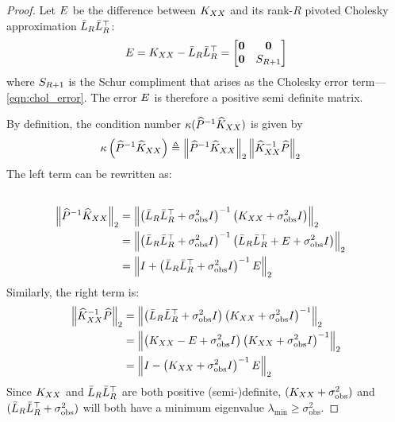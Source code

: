 \begin{proof}
  Let $E$ be the difference between $K_{XX}$ and its rank-$R$ pivoted Cholesky approximation $\bar{L}_R \bar{L}_R^\top$:
  \[
    E = K_{XX} - \bar{L}_R \bar{L}_R^\top = \begin{bmatrix} \mathbf{0} & \mathbf{0} \\ \mathbf{0} & S_{R+1} \end{bmatrix}
  \]
  where $S_{R+1}$ is the Schur compliment that arises as the Cholesky error term---\cref{eqn:chol_error}.
  The error $E$ is therefore a positive semi definite matrix.

  By definition, the condition number $\kappa ( \widehat{P}^{-1}\widehat{K}_{XX} )$ is given by
  \begin{align*}
    \kappa \left( \widehat{P}^{-1}\widehat{K}_{XX} \right)
    &\triangleq \left\Vert \widehat{P}^{-1}\widehat{K}_{XX} \right\Vert_{2} \left\Vert \widehat{K}_{XX}^{-1}\widehat{P} \right\Vert_{2}
  \end{align*}
  The left term can be rewritten as:
  \begin{align*}
    \\
    \left\Vert \widehat{P}^{-1}\widehat{K}_{XX} \right\Vert_{2}
    &= \left\Vert \left( \bar{L}_R \bar{L}_R^\top + \sigma^2_\text{obs} I \right)^{-1} \left(K_{XX} + \sigma^2_\text{obs} I \right) \right\Vert_{2}
    \\
    &= \left\Vert \left( \bar{L}_R \bar{L}_R^\top + \sigma^2_\text{obs} I \right)^{-1} \left(\bar{L}_R \bar{L}_R^\top + E + \sigma^2_\text{obs} I \right) \right\Vert_{2}
    \\
    &= \left\Vert I + \left( \bar{L}_R \bar{L}_R^\top + \sigma^2_\text{obs} I \right)^{-1} E \right\Vert_{2}
  \end{align*}
  Similarly, the right term is:
  \begin{align*}
    \left\Vert \widehat{K}_{XX}^{-1}\widehat{P} \right\Vert_{2}
    &= \left\Vert \left( \bar{L}_R \bar{L}_R^\top + \sigma^2_\text{obs} I \right) \left(K_{XX} + \sigma^2_\text{obs} I \right)^{-1} \right\Vert_{2}
    \\
    &= \left\Vert \left( K_{XX} - E + \sigma^2_\text{obs} I \right) \left(K_{XX} + \sigma^2_\text{obs} I \right)^{-1} \right\Vert_{2}
    \\
    &= \left\Vert I - \left(K_{XX} + \sigma^2_\text{obs} I \right)^{-1} E \right\Vert_{2}
  \end{align*}
  Since $K_{XX}$ and $\bar{L}_R \bar{L}_R^\top$ are both positive (semi-)definite,
  $(K_{XX} + \sigma^2_\text{obs})$ and $(\bar{L}_R \bar{L}_R^\top + \sigma^2_\text{obs})$ will both have a minimum eigenvalue $\lambda_\text{min} \geq \sigma^2_\text{obs}$.

\end{proof}
